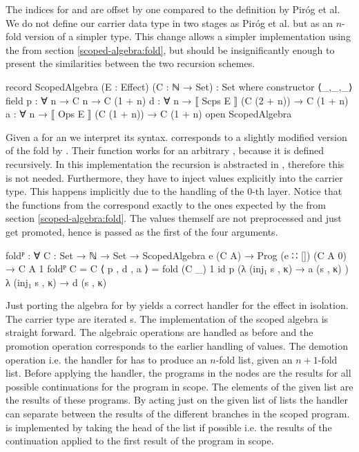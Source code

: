 The indices for  and  are offset by one compared to
the definition by Piróg et al.
We do not define our carrier data type in two stages as Piróg et al. but as an
$n$-fold version of a simpler type.
This change allows a simpler implementation using the  from
section \ref{scoped-algebra:fold}, but should be insignificantly enough to
present the similarities between the two recursion schemes.

\begin{code}
record ScopedAlgebra (E : Effect) (C : ℕ → Set) : Set where
  constructor ⟨_,_,_⟩
  field
    p : ∀ {n} → C n                      → C (1 + n)
    d : ∀ {n} → ⟦ Scps  E ⟧ (C (2 + n))  → C (1 + n)
    a : ∀ {n} → ⟦ Ops   E ⟧ (C (1 + n))  → C (1 + n)
open ScopedAlgebra
\end{code}
Given a  for an  we
interpret its syntax.
 corresponds to a slightly modified version of the fold by
\textcite{DBLP:conf/lics/PirogSWJ18}.
Their function works for an arbitrary , because it is defined
recursively. 
In this implementation the recursion is abstracted in ,
therefore this is not needed.
Furthermore, they have to inject values explicitly into the carrier type.
This happens implicitly due to the handling of the $0$-th layer.
Notice that the functions from the  correspond
exactly to the ones expected by the  from section
\ref{scoped-algebra:fold}.
The values themself are not preprocessed and just get promoted, hence
 is passed as the first of the four arguments.

\begin{code}
foldᴾ : ∀ {C : Set → ℕ → Set} → ScopedAlgebra e (C A) → 
  Prog (e ∷ []) (C A 0) → C A 1
foldᴾ {C = C} ⟨ p , d , a ⟩ = fold (C _) 1 id p
  (λ{ (inj₁ s , κ) → a (s , κ) }) λ{ (inj₁ s , κ) → d (s , κ) }
\end{code}
Just porting the algebra for  by
\textcite{DBLP:conf/lics/PirogSWJ18} yields a
correct handler for the effect in isolation.
The carrier type are iterated s.
The implementation of the scoped algebra is straight forward.
The algebraic operations are handled as before and the promotion operation
corresponds to the earlier handling of values.
The demotion operation i.e. the handler for  has
to produce an $n$-fold list, given an $n+1$-fold list.
Before applying the handler, the programs in the 
nodes are the results for all possible continuations for the program in scope.
The elements of the given list are the results of these programs.
By acting just on the given list of lists the handler can separate between the
results of the different branches in the scoped program.
 is implemented by taking the head of the list if possible
i.e. the results of the continuation applied to the first result of the program
in scope.

